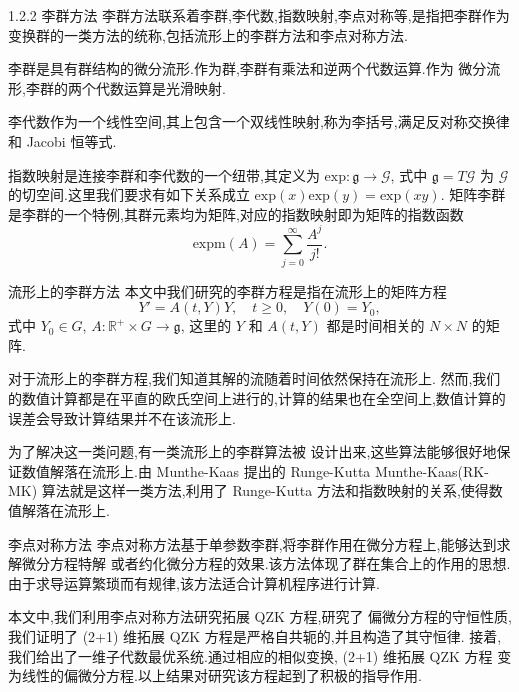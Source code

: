 \documentclass{beamer}
\begin{document}
\begin{frame}{1.2.2 李群方法}
\qquad 李群方法联系着李群,李代数,指数映射,李点对称等,是指把李群作为变换群的一类方法的统称,包括流形上的李群方法和李点对称方法.

\qquad 李群是具有群结构的微分流形.作为群,李群有乘法和逆两个代数运算.作为
微分流形,李群的两个代数运算是光滑映射.

\qquad 李代数作为一个线性空间,其上包含一个双线性映射,称为李括号,满足反对称交换律和 Jacobi 恒等式.

\qquad 指数映射是连接李群和李代数的一个纽带,其定义为 $\mathrm{exp}: \mathfrak{g}\to \mathcal{G}$,
式中 $\mathfrak{g}=T\mathcal{G}$ 为 $\mathcal{G}$ 的切空间.这里我们要求有如下关系成立 $\mathrm{exp}(x)\mathrm{exp}(y)=\mathrm{exp}(xy)$. 矩阵李群是李群的一个特例,其群元素均为矩阵,对应的指数映射即为矩阵的指数函数
\begin{equation*}
	\mbox{expm}(A)=\sum_{j=0}^{\infty}\frac{A^j}{j!}.
\end{equation*}

\end{frame}

\begin{frame}{流形上的李群方法}
\qquad 本文中我们研究的李群方程是指在流形上的矩阵方程
\begin{equation*}
	Y'=A(t,Y)Y,\quad t\geq 0,\quad Y(0)=Y_0,
\end{equation*}
式中 $Y_0\in G $, $A:\mathbb{R}^+\times G\to \mathfrak{g}$, 这里的 $Y$ 和 $A(t,Y)$ 都是时间相关的 $N\times N$ 的矩阵.

\qquad 对于流形上的李群方程,我们知道其解的流随着时间依然保持在流形上.
然而,我们的数值计算都是在平直的欧氏空间上进行的,计算的结果也在全空间上,数值计算的
误差会导致计算结果并不在该流形上.

\qquad 为了解决这一类问题,有一类流形上的李群算法被
设计出来,这些算法能够很好地保证数值解落在流形上.由 Munthe-Kaas 提出的 Runge-Kutta Munthe-Kaas(RK-MK) 算法就是这样一类方法,利用了 Runge-Kutta 方法和指数映射的关系,使得数值解落在流形上.
\end{frame}

\begin{frame}{李点对称方法}
\qquad 李点对称方法基于单参数李群,将李群作用在微分方程上,能够达到求解微分方程特解
或者约化微分方程的效果.该方法体现了群在集合上的作用的思想.由于求导运算繁琐而有规律,该方法适合计算机程序进行计算.

\qquad 本文中,我们利用李点对称方法研究拓展 QZK 方程,研究了
偏微分方程的守恒性质,我们证明了 (2+1) 维拓展 QZK 方程是严格自共轭的,并且构造了其守恒律.
接着,我们给出了一维子代数最优系统.通过相应的相似变换, (2+1) 维拓展 QZK 方程
变为线性的偏微分方程.以上结果对研究该方程起到了积极的指导作用.
\end{frame}
\end{document}

